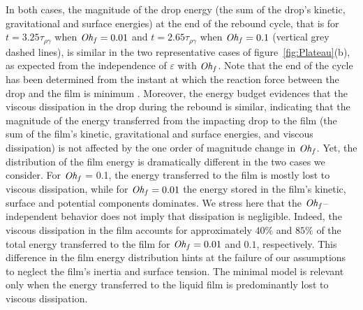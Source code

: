 In both cases, the magnitude of the drop energy (the sum of the drop's kinetic, gravitational and surface energies) at the end of the rebound cycle, that is for $t = 3.25\tau_{\rho\gamma}$ when $\mathit{Oh}_\mathit{f} = 0.01$ and $t = 2.65\tau_{\rho\gamma}$ when $\mathit{Oh}_\mathit{f} = 0.1$ (vertical grey dashed lines), is similar in the two representative cases of figure~\ref{fig:Plateau}(b), as expected from the independence of $\varepsilon$ with $\mathit{Oh}_\mathit{f}$. Note that the end of the cycle has been determined from the instant at which the reaction force between the drop and the film is minimum \citep[see appendix~\ref{sec:restitution in simulations} and][]{zhang2022impact}. Moreover, the energy budget evidences that the viscous dissipation in the drop during the rebound is similar, indicating that the magnitude of the energy transferred from the impacting drop to the film (the sum of the film's kinetic, gravitational and surface energies, and viscous dissipation) is not affected by the one order of magnitude change in $\mathit{Oh}_\mathit{f}$. Yet, the distribution of the film energy is dramatically different in the two cases we consider. For $\mathit{Oh}_\mathit{f}$ = 0.1, the energy transferred to the film is mostly lost to viscous dissipation, while for $\mathit{Oh}_\mathit{f} = 0.01$ the energy stored in the film's kinetic, surface and potential components dominates. We stress here that the $\mathit{Oh}_\mathit{f}$--independent behavior does not imply that dissipation is negligible. Indeed, the viscous dissipation in the film accounts for approximately $40\%$ and $85\%$ of the total energy transferred to the film for $\mathit{Oh}_\mathit{f} = 0.01$ and $0.1$, respectively. This difference in the film energy distribution hints at the failure of our assumptions to neglect the film's inertia and surface tension. The minimal model is relevant only when the energy transferred to the liquid film is predominantly lost to viscous dissipation. 

